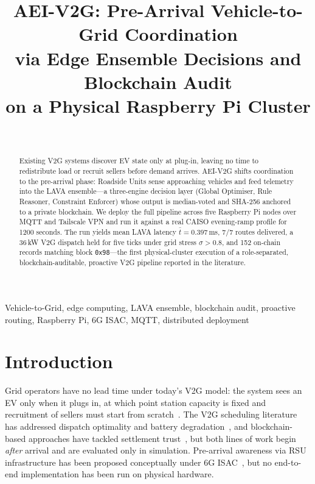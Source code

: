 \documentclass[journal,twoside,twocolumn]{IEEEtran}
\begin{document}
\IEEEoverridecommandlockouts
\setlength{\columnsep}{0.2in}

\title{AEI-V2G: Pre-Arrival Vehicle-to-Grid Coordination\\
via Edge Ensemble Decisions and Blockchain Audit\\
on a Physical Raspberry Pi Cluster}

\author{
\\
}

\maketitle

\begin{abstract}
Existing V2G systems discover EV state only at plug-in, leaving no time to
redistribute load or recruit sellers before demand arrives.
AEI-V2G shifts coordination to the pre-arrival phase: Roadside Units sense
approaching vehicles and feed telemetry into the LAVA ensemble---a three-engine
decision layer (Global Optimiser, Rule Reasoner, Constraint Enforcer) whose
output is median-voted and SHA-256 anchored to a private blockchain. We deploy
the full pipeline across five Raspberry Pi nodes over MQTT and Tailscale VPN and
run it against a real CAISO evening-ramp profile for 1200 seconds. The run yields
mean LAVA latency $\bar{t} = 0.397$\,ms, 7/7 routes delivered, a 36\,kW V2G
dispatch held for five ticks under grid stress $\sigma > 0.8$, and 152 on-chain
records matching block \texttt{0x98}---the first physical-cluster execution of a
role-separated, blockchain-auditable, proactive V2G pipeline reported in the
literature.
\end{abstract}

\begin{IEEEkeywords}
Vehicle-to-Grid, edge computing, LAVA ensemble, blockchain audit, proactive
routing, Raspberry Pi, 6G ISAC, MQTT, distributed deployment
\end{IEEEkeywords}

\section{Introduction}
\label{sec:intro}

Grid operators have no lead time under today's V2G model: the system sees an EV
only when it plugs in, at which point station capacity is fixed and recruitment of
sellers must start from scratch~\cite{krueger2020v2g}. The V2G scheduling
literature has addressed dispatch optimality and battery
degradation~\cite{ginigeme2020distributed}, and blockchain-based approaches have
tackled settlement trust~\cite{zhou2020v2g}, but both lines of work begin
\emph{after} arrival and are evaluated only in simulation. Pre-arrival awareness
via RSU infrastructure has been proposed conceptually under 6G
ISAC~\cite{isac2023}, but no end-to-end implementation has been run on physical
hardware.
\end{document}
